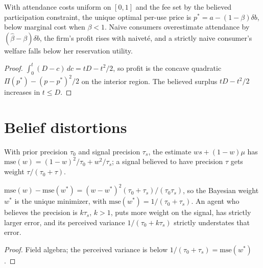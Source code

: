 \begin{theorem}
\label{thm:beh-dm}
\leanok
With attendance costs uniform on $[0,1]$ and the fee set by the believed participation constraint, the unique
optimal per-use price is $p^*=a-(1-\beta)\delta b$, below marginal cost when $\beta<1$. Naive consumers
overestimate attendance by $(\hat\beta-\beta)\delta b$, the firm's profit rises with naivet\'e, and a strictly naive
consumer's welfare falls below her reservation utility.
\end{theorem}
\begin{proof}
\leanok
$\int_0^t(D-c)\,dc=tD-t^2/2$, so profit is the concave quadratic $\Pi(p^*)-(p-p^*)^2/2$ on the interior region.
The believed surplus $tD-t^2/2$ increases in $t\le D$.
\end{proof}


\section{Belief distortions}

\begin{definition}
\label{def:beh-oc-mse}
\leanok
With prior precision $\tau_0$ and signal precision $\tau_s$, the estimate $ws+(1-w)\mu$ has
$\mathrm{mse}(w)=(1-w)^2/\tau_0+w^2/\tau_s$; a signal believed to have precision $\tau$ gets weight $\tau/(\tau_0+\tau)$.
\end{definition}

\begin{theorem}
\label{thm:beh-oc}
\leanok
$\mathrm{mse}(w)-\mathrm{mse}(w^*)=(w-w^*)^2(\tau_0+\tau_s)/(\tau_0\tau_s)$, so the Bayesian weight $w^*$ is the unique
minimizer, with $\mathrm{mse}(w^*)=1/(\tau_0+\tau_s)$. An agent who believes the precision is $k\tau_s$, $k>1$, puts more
weight on the signal, has strictly larger error, and its perceived variance $1/(\tau_0+k\tau_s)$ strictly understates
that error.
\end{theorem}
\begin{proof}
\leanok
Field algebra; the perceived variance is below $1/(\tau_0+\tau_s)=\mathrm{mse}(w^*)$.
\end{proof}

